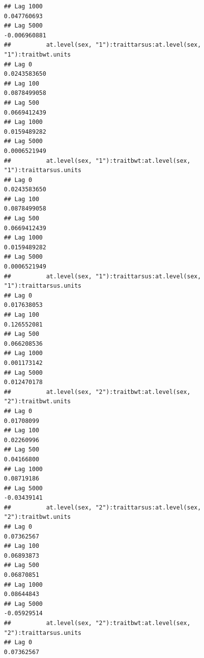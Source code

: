 \documentclass[
  12pt,
]{book}
\begin{document}
\begin{verbatim}
## Lag 1000                                                   0.047760693
## Lag 5000                                                  -0.006960881
##          at.level(sex, "1"):traittarsus:at.level(sex, "1"):traitbwt.units
## Lag 0                                                        0.0243583650
## Lag 100                                                      0.0878499058
## Lag 500                                                      0.0669412439
## Lag 1000                                                     0.0159489282
## Lag 5000                                                     0.0006521949
##          at.level(sex, "1"):traitbwt:at.level(sex, "1"):traittarsus.units
## Lag 0                                                        0.0243583650
## Lag 100                                                      0.0878499058
## Lag 500                                                      0.0669412439
## Lag 1000                                                     0.0159489282
## Lag 5000                                                     0.0006521949
##          at.level(sex, "1"):traittarsus:at.level(sex, "1"):traittarsus.units
## Lag 0                                                            0.017638053
## Lag 100                                                          0.126552081
## Lag 500                                                          0.066208536
## Lag 1000                                                         0.001173142
## Lag 5000                                                         0.012470178
##          at.level(sex, "2"):traitbwt:at.level(sex, "2"):traitbwt.units
## Lag 0                                                       0.01708099
## Lag 100                                                     0.02260996
## Lag 500                                                     0.04166800
## Lag 1000                                                    0.08719186
## Lag 5000                                                   -0.03439141
##          at.level(sex, "2"):traittarsus:at.level(sex, "2"):traitbwt.units
## Lag 0                                                          0.07362567
## Lag 100                                                        0.06893873
## Lag 500                                                        0.06870851
## Lag 1000                                                       0.08644843
## Lag 5000                                                      -0.05929514
##          at.level(sex, "2"):traitbwt:at.level(sex, "2"):traittarsus.units
## Lag 0                                                          0.07362567

\end{verbatim}
\end{document}
